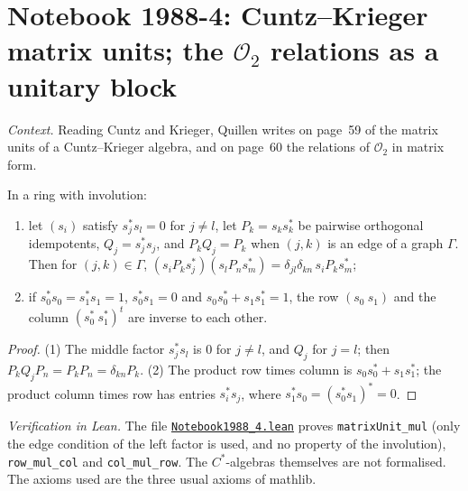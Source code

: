 \section[Notebook 1988-4: Cuntz--Krieger matrix units]{Notebook 1988-4: Cuntz--Krieger matrix units; the $\mathcal O_2$ relations as a unitary block\protect{}}\label{sec:quillen-1988-4}

\emph{Context.} Reading Cuntz and Krieger, Quillen writes on page~59 of  the matrix units of a Cuntz--Krieger algebra, and on page~60 the relations of $\mathcal O_2$ in matrix form.

\begin{encadre}
\begin{theoreme}\label{thm:quillen-1988-4}
In a ring with involution:
\begin{enumerate}
\item let $(s_i)$ satisfy $s_j^*s_l = 0$ for $j \ne l$, let $P_k = s_ks_k^*$ be pairwise orthogonal idempotents, $Q_j = s_j^*s_j$, and $P_kQ_j = P_k$ when $(j, k)$ is an edge of a graph $\Gamma$. Then for $(j, k) \in \Gamma$, $(s_iP_ks_j^*)(s_lP_ns_m^*) = \delta_{jl}\delta_{kn}\,s_iP_ks_m^*$;
\item if $s_0^*s_0 = s_1^*s_1 = 1$, $s_0^*s_1 = 0$ and $s_0s_0^* + s_1s_1^* = 1$, the row $(s_0\ s_1)$ and the column $(s_0^*\ s_1^*)^t$ are inverse to each other.
\end{enumerate}
\end{theoreme}
\end{encadre}

\begin{proof}
(1) The middle factor $s_j^*s_l$ is $0$ for $j \ne l$, and $Q_j$ for $j = l$; then $P_kQ_jP_n = P_kP_n = \delta_{kn}P_k$. (2) The product row times column is $s_0s_0^* + s_1s_1^*$; the product column times row has entries $s_i^*s_j$, where $s_1^*s_0 = (s_0^*s_1)^* = 0$.
\end{proof}

\emph{Verification in Lean.} The file \href{\leanblobmain/Notebook1988_4.lean}{\texttt{Notebook1988\_4.\allowbreak{}lean}} proves \texttt{matrixUnit\_mul} (only the edge condition of the left factor is used, and no property of the involution), \texttt{row\_mul\_col} and \texttt{col\_mul\_row}. The $C^*$-algebras themselves are not formalised. The axioms used are the three usual axioms of mathlib.

